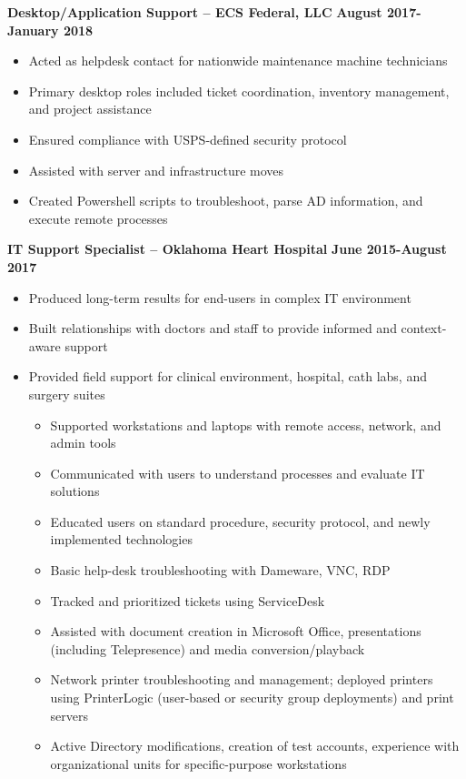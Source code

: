 \documentclass[line]{res}
\begin{document}
\begin{resume}
\begin{itemize}
\begin{itemize}
			\end{itemize}
	\end{itemize} 
\textbf{Desktop/Application Support -- ECS Federal, LLC}
\newline
\textbf{August 2017-January 2018}
	\begin{itemize}
		\item Acted as helpdesk contact for nationwide maintenance machine technicians
		\item Primary desktop roles included ticket coordination, inventory management, and project assistance
		\item Ensured compliance with USPS-defined security protocol
		\item Assisted with server and infrastructure moves
		\item Created Powershell scripts to troubleshoot, parse AD information, and execute remote processes
	\end{itemize}
\textbf{IT Support Specialist -- Oklahoma Heart Hospital}
\newline
\textbf{June 2015-August 2017}
	\begin{itemize}
		\item Produced long-term results for end-users in complex IT environment
		\item Built relationships with doctors and staff to provide informed and context-aware support
		\item Provided field support for clinical environment, hospital, cath labs, and surgery suites
			\begin{itemize}
				\item Supported workstations and laptops with remote access, network, and admin tools
				\item Communicated with users to understand processes and evaluate IT solutions
				\item Educated users on standard procedure, security protocol, and newly implemented technologies
				\item Basic help-desk troubleshooting with Dameware, VNC, RDP
				\item Tracked and prioritized tickets using ServiceDesk
				\item Assisted with document creation in Microsoft Office, presentations (including Telepresence) and media conversion/playback
				\item Network printer troubleshooting and management; deployed printers using PrinterLogic (user-based or security group deployments) and print servers
				\item Active Directory modifications, creation of test accounts, experience with organizational units for specific-purpose workstations

\end{itemize}
\end{itemize}
\end{resume}
\end{document}
